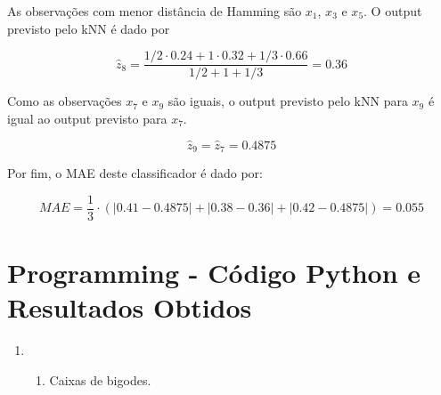 \documentclass[a4paper,12pt]{article} %
\begin{document}
\begin{enumerate}
As observações com menor distância de Hamming são $x_1$, $x_3$ e $x_5$. O output previsto pelo kNN é dado por 

\begin{equation*}
    \hat{z}_{8} = \frac{1/2 \cdot 0.24 + 1 \cdot 0.32 + 1/3 \cdot 0.66}{1/2 + 1 + 1/3} = 0.36
\end{equation*}

Como as observações $x_7$ e $x_9$ são iguais, o output previsto pelo kNN para  $x_9$ é igual ao output previsto para $x_7$.

\begin{equation*}
    \hat{z}_{9} = \hat{z}_{7} = 0.4875
\end{equation*}

Por fim, o MAE deste classificador é dado por:

\begin{equation*}
    MAE = \frac{1}{3} \cdot (|0.41 - 0.4875| + |0.38 - 0.36| + |0.42 - 0.4875|) = 0.055
\end{equation*}

\end{enumerate}

\clearpage
\section*{Programming - Código Python e Resultados Obtidos}

\begin{enumerate}
    \item \begin{enumerate}
        \item Caixas de bigodes.
    \end{enumerate}
    
\end{enumerate}
\end{document}
